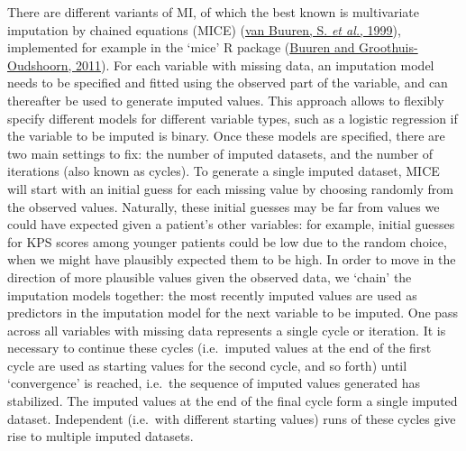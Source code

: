 \documentclass[
  letterpaper,
  DIV=11,
  numbers=noendperiod]{scrreprt}
\begin{document}
There are different variants of MI, of which the best known is
multivariate imputation by chained equations (MICE)
(\protect\hyperlink{ref-vanbuurens.FlexibleMultivariateImputation1999}{van
Buuren, S. \emph{et al.}, 1999}), implemented for example in the `mice'
R package
(\protect\hyperlink{ref-buurenMiceMultivariateImputation2011}{Buuren and
Groothuis-Oudshoorn, 2011}). For each variable with missing data, an
imputation model needs to be specified and fitted using the observed
part of the variable, and can thereafter be used to generate imputed
values. This approach allows to flexibly specify different models for
different variable types, such as a logistic regression if the variable
to be imputed is binary. Once these models are specified, there are two
main settings to fix: the number of imputed datasets, and the number of
iterations (also known as cycles). To generate a single imputed dataset,
MICE will start with an initial guess for each missing value by choosing
randomly from the observed values. Naturally, these initial guesses may
be far from values we could have expected given a patient's other
variables: for example, initial guesses for KPS scores among younger
patients could be low due to the random choice, when we might have
plausibly expected them to be high. In order to move in the direction of
more plausible values given the observed data, we `chain' the imputation
models together: the most recently imputed values are used as predictors
in the imputation model for the next variable to be imputed. One pass
across all variables with missing data represents a single cycle or
iteration. It is necessary to continue these cycles (i.e.~imputed values
at the end of the first cycle are used as starting values for the second
cycle, and so forth) until `convergence' is reached, i.e.~the sequence
of imputed values generated has stabilized. The imputed values at the
end of the final cycle form a single imputed dataset. Independent
(i.e.~with different starting values) runs of these cycles give rise to
multiple imputed datasets.
\end{document}
